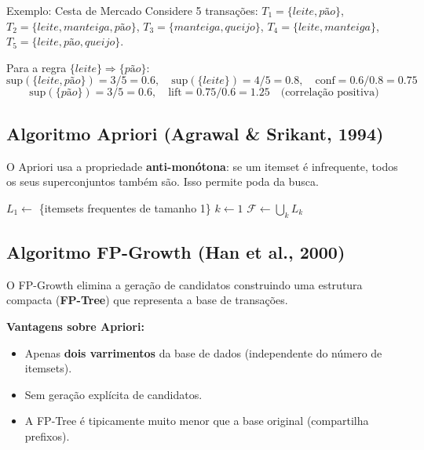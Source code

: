 \documentclass[12pt,a4paper]{article}
\begin{document}
\begin{exemplobox}{Exemplo: Cesta de Mercado}
Considere 5 transações: $T_1=\{leite, pão\}$, $T_2=\{leite, manteiga, pão\}$, $T_3=\{manteiga, queijo\}$, $T_4=\{leite, manteiga\}$, $T_5=\{leite, pão, queijo\}$.

Para a regra $\{leite\} \Rightarrow \{pão\}$:
\[
  \text{sup}(\{leite, pão\}) = 3/5 = 0.6, \quad
  \text{sup}(\{leite\}) = 4/5 = 0.8, \quad
  \text{conf} = 0.6/0.8 = 0.75
\]
\[
  \text{sup}(\{pão\}) = 3/5 = 0.6, \quad
  \text{lift} = 0.75/0.6 = 1.25 \quad \text{(correlação positiva)}
\]
\end{exemplobox}

\subsection{Algoritmo Apriori (Agrawal \& Srikant, 1994)}

O Apriori usa a propriedade \textbf{anti-monótona}: se um itemset é infrequente, todos os seus superconjuntos também são. Isso permite poda da busca.

\begin{algorithm}[H]
\caption{Apriori}
$L_1 \leftarrow$ \{itemsets frequentes de tamanho 1\}\;
$k \leftarrow 1$\;
$\mathcal{F} \leftarrow \bigcup_k L_k$ 
\end{algorithm}

\subsection{Algoritmo FP-Growth (Han et al., 2000)}

O FP-Growth elimina a geração de candidatos construindo uma estrutura compacta (\textbf{FP-Tree}) que representa a base de transações.

\textbf{Vantagens sobre Apriori:}
\begin{itemize}
  \item Apenas \textbf{dois varrimentos} da base de dados (independente do número de itemsets).
  \item Sem geração explícita de candidatos.
  \item A FP-Tree é tipicamente muito menor que a base original (compartilha prefixos).
\end{itemize}
\end{document}
